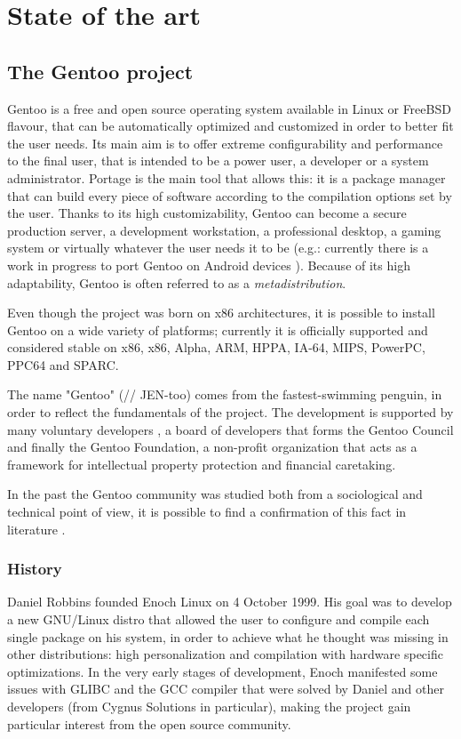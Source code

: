 \chapter{State of the art}

\section{The Gentoo project}
Gentoo is a free and open source operating system available in Linux or FreeBSD flavour, that can be automatically optimized and customized in order to better fit the user needs. Its main aim is to offer extreme configurability and performance to the final user, that is intended to be a power user, a developer or a system administrator. Portage is the main tool that allows this: it is a package manager that can build every piece of software according to the compilation options set by the user.
Thanks to its high customizability, Gentoo can become a secure production server, a development workstation, a professional desktop, a gaming system or virtually whatever the user needs it to be (e.g.: currently there is a work in progress to port Gentoo on Android devices  \cite{gentoo_android}). Because of its high adaptability, Gentoo is often referred to as a \emph{metadistribution}.

Even though the project was born on x86 architectures, it is possible to install Gentoo on a wide variety of platforms; currently it is officially supported and considered stable on x86, x86, Alpha, ARM, HPPA, IA-64, MIPS, PowerPC, PPC64 and SPARC.

The name "Gentoo" (// JEN-too) comes from the fastest-swimming penguin, in order to reflect the fundamentals of the project.
The development is supported by many voluntary developers \cite{gentoo_developers}, a board of developers that forms the Gentoo Council and finally the Gentoo Foundation, a non-profit organization that acts as a framework for intellectual property protection and financial caretaking.

In the past the Gentoo community was studied both from a sociological and technical point of view, it is possible to find a confirmation of this fact in literature \cite{gentoo_book} \cite{gentoo_rise} \cite{gentoo_distributed} \cite{gentoo_ng}.


\subsection{History}
Daniel Robbins founded Enoch Linux on 4 October 1999. His goal was to develop a new GNU/Linux distro that allowed the user to configure and compile each single package on his system, in order to achieve what he thought was missing in other distributions: high personalization and compilation with hardware specific optimizations.
In the very early stages of development, Enoch manifested some issues with GLIBC and the GCC compiler that were solved by Daniel and other developers (from Cygnus Solutions in particular), making the project gain particular interest from the open source community.

